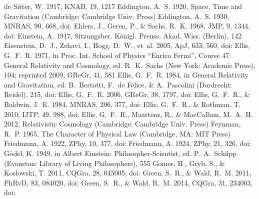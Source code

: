 \documentclass[twocolumn]{aastex701}
\begin{document}
\begin{thebibliography}{}
 de Sitter, W. 1917, KNAB, 19, 1217
 Eddington, A.~S. 1920, Space, Time and Gravitation (Cambridge: Cambridge Univ. Press)
 Eddington, A.~S. 1930, MNRAS, 90, 668, doi:
 Ehlers, J., Geren, P., \& Sachs, R.~K. 1968, JMP, 9, 1344, doi:
 Einstein, A. 1917, Sitzungsber. K\"onigl. Preuss. Akad. Wiss. (Berlin), 142
 Eisenstein, D.~J., Zehavi, I., Hogg, D.~W., {et~al.} 2005, ApJ, 633, 560, doi:
 Ellis, G.~F.~R. 1971, in Proc. Int. School of Physics ``Enrico Fermi'', Course 47: General Relativity and Cosmology, ed. R.~K.~Sachs (New York: Academic Press), 104; reprinted 2009, GReGr, 41, 581
 Ellis, G.~F.~R. 1984, in General Relativity and Gravitation, ed. B.~Bertotti, F.~de Felice, \& A.~Pascolini (Dordrecht: Reidel), 215, doi:
 Ellis, G.~F.~R. 2006, GReGr, 38, 1797, doi:
 Ellis, G.~F.~R., \& Baldwin, J.~E. 1984, MNRAS, 206, 377, doi:
 Ellis, G.~F.~R., \& Rothman, T. 2010, IJTP, 49, 988, doi:
 Ellis, G.~F.~R., Maartens, R., \& MacCallum, M.~A.~H. 2012, Relativistic Cosmology (Cambridge: Cambridge Univ. Press)
 Feynman, R.~P. 1965, The Character of Physical Law (Cambridge, MA: MIT Press)
 Friedmann, A. 1922, ZPhy, 10, 377, doi:
 Friedmann, A. 1924, ZPhy, 21, 326, doi:
 G{\"o}del, K. 1949, in Albert Einstein: Philosopher-Scientist, ed. P.~A.~Schilpp (Evanston: Library of Living Philosophers), 555
 Gomes, H., Gryb, S., \& Koslowski, T. 2011, CQGra, 28, 045005, doi:
 Green, S.~R., \& Wald, R.~M. 2011, PhRvD, 83, 084020, doi:
 Green, S.~R., \& Wald, R.~M. 2014, CQGra, 31, 234003, doi:

\end{thebibliography}
\end{document}
